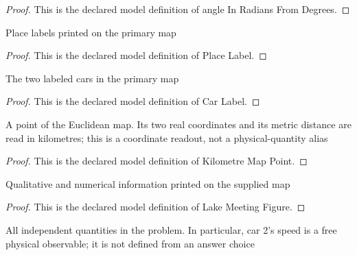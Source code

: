\begin{proof}
  This is the declared model definition of angle In Radians From Degrees.
\end{proof}
\begin{definition}
  \label{def:physics:phyx-mini-0690:phyxminiproblems-problemphyxmini0690-placelabel}
  Place labels printed on the primary map
\end{definition}
\begin{proof}
  This is the declared model definition of Place Label.
\end{proof}
\begin{definition}
  \label{def:physics:phyx-mini-0690:phyxminiproblems-problemphyxmini0690-carlabel}
  The two labeled cars in the primary map
\end{definition}
\begin{proof}
  This is the declared model definition of Car Label.
\end{proof}
\begin{definition}
  \label{def:physics:phyx-mini-0690:phyxminiproblems-problemphyxmini0690-kilometremappoint}
  A point of the Euclidean map. Its two real coordinates and its metric distance are read in kilometres; this is a coordinate readout, not a physical-quantity alias
\end{definition}
\begin{proof}
  This is the declared model definition of Kilometre Map Point.
\end{proof}
\begin{definition}
  \label{def:physics:phyx-mini-0690:phyxminiproblems-problemphyxmini0690-lakemeetingfigure}
  Qualitative and numerical information printed on the supplied map
\end{definition}
\begin{proof}
  This is the declared model definition of Lake Meeting Figure.
\end{proof}
\begin{definition}
  \label{def:physics:phyx-mini-0690:phyxminiproblems-problemphyxmini0690-lakemeetingsetup}
  All independent quantities in the problem. In particular, car 2's speed is a free physical observable; it is not defined from an answer choice
\end{definition}
